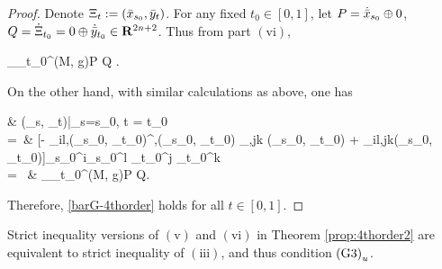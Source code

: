 \begin{proof}
		Denote $\Xi_{t} := (\bar{x}_{s_0}, \bar{y}_t)$. For any fixed $t_0 \in [0,1]$, let $P = \dot{\bar{x}}_{s_0} \oplus 0$, $Q = \dot{\Xi}_{t_0} = 0 \oplus \dot{\bar{y}}_{t_0} \in {\mathbf R}^{2n+2}$. Thus from part $\mathrm{(vi)}$, 
		\begin{flalign}
			 \sec_{\Xi_{t_0}}^{(M, g)}P \wedge Q
			 .
		\end{flalign}
		On the other hand, with similar calculations as above, one has
		\begin{flalign}
		& \barG(\barx_s, \bary_t)\Bigg|_{s=s_0, t = t_0} \\
		=\ & [- \barG_{il,\alpha}(\barx_{s_0}, \bary_{t_0})\cdot \barG^{\beta,\alpha}(\barx_{s_0}, \bary_{t_0}) \cdot \barG_{\beta,jk} (\barx_{s_0}, \bary_{t_0}) + \barG_{il,jk}(\barx_{s_0}, \bary_{t_0})]\cdot \dot{\barx}_{s_0}^{i}\cdot\dot{\barx}_{s_0}^{l} \cdot\dot{\bary}_{t_0}^{j} \cdot \dot{\bary}_{t_0}^{k}\\
		= \ & \sec_{\Xi_{t_0}}^{(M, g)}P \wedge Q.
		\end{flalign}
	Therefore, \eqref{barG-4thorder} holds for all $t \in [0,1]$.
\end{proof}



\begin{remark}
	Strict inequality versions of $\mathrm{(v)}$ and $\mathrm{(vi)}$ in Theorem \ref{prop:4thorder2} are equivalent to strict inequality of $\mathrm{(iii)}$, and thus condition ${\rm (G3)}_{u}$.
\end{remark}

%
